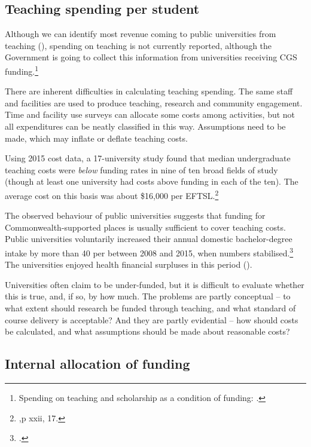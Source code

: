\documentclass{grattan}
\begin{document}
%
\subsection{Teaching spending per student}\label{subsec:teaching-spending-per-student}

Although we can identify most revenue coming to public universities from teaching (), spending on teaching is not currently reported, although the Government is going to collect this information from universities receiving CGS funding.\footnote{Spending on teaching and scholarship as a condition of funding: \textcite[][]{DepartmentofEducationandTraining2018highereducationpr}.}

There are inherent difficulties in calculating teaching spending. The same staff and facilities are used to produce teaching, research and community engagement. Time and facility use surveys can allocate some costs among activities, but not all expenditures can be neatly classified in this way. Assumptions need to be made, which may inflate or deflate teaching costs.

Using 2015 cost data, a 17-university study found that median undergraduate teaching costs were \emph{below} funding rates in nine of ten broad fields of study (though at least one university had costs above funding in each of the ten). The average cost on this basis was about \$16,000 per EFTSL.\footnote{\textcite[][]{DeloitteAccessEconomics2017costofdeliveryof} ,p xxii, 17.}

The observed behaviour of public universities suggests that funding for Commonwealth-supported places is usually sufficient to cover teaching costs. Public universities voluntarily increased their annual domestic bachelor-degree intake by more than 40 per between 2008 and 2015, when numbers stabilised.\footcite[][]{DepartmentofEducationandTraining2018ucubehighereduc} The universities enjoyed health financial surpluses in this period ().

Universities often claim to be under-funded, but it is difficult to evaluate whether this is true, and, if so, by how much. The problems are partly conceptual -- to what extent should research be funded through teaching, and what standard of course delivery is acceptable? And they are partly evidential -- how should costs be calculated, and what assumptions should be made about reasonable costs?

%
\subsection{Internal allocation of funding}\label{subsec:internal-allocation-of-funding}
\end{document}
